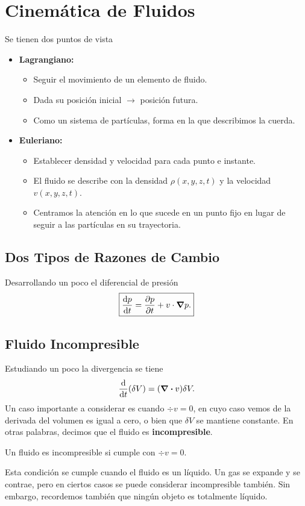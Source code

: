 \section{Cinemática de Fluidos}
Se tienen dos puntos de vista
\begin{itemize}
	\item \textbf{Lagrangiano:} 
	\begin{itemize}
		\item Seguir el movimiento de un elemento de fluido.
		\item Dada su posición inicial $\to$ posición futura.
		\item Como un sistema de partículas, forma en la que describimos la cuerda.
	\end{itemize}
	\item \textbf{Euleriano:}
	\begin{itemize}
		\item Establecer densidad y velocidad para cada punto e instante.
		\item El fluido se describe con la densidad $\rho (x,y,z,t)$ y la velocidad $v(x,y,z,t)$.
		\item Centramos la atención en lo que sucede en un punto fijo en lugar de seguir a las partículas en su trayectoria.
	\end{itemize}
\end{itemize}


\subsection{Dos Tipos de Razones de Cambio}
Desarrollando un poco el diferencial de presión
\begin{equation}
	\boxed{ \dv{p}{t} = \pdv{p}{t} + v\cdot \grad{p}. }
\end{equation}

\subsection{Fluido Incompresible}
Estudiando un poco la divergencia se tiene
\begin{equation}
	\dv{t} (\delta V) = (\div{v}) \delta V.
\end{equation}
Un caso importante a considerar es cuando $\div{v} = 0$, en cuyo caso vemos de la derivada del volumen es igual a cero, o bien que $\delta V$ se mantiene constante. En otras palabras, decimos que el fluido es \textbf{incompresible}.

\begin{tcolorbox}
	Un fluido es incompresible si cumple con $\div{v} = 0$.
\end{tcolorbox}
Esta condición se cumple cuando el fluido es un líquido. Un gas se expande y se contrae, pero en ciertos casos se puede considerar incompresible también. Sin embargo, recordemos también que ningún objeto es totalmente líquido.

